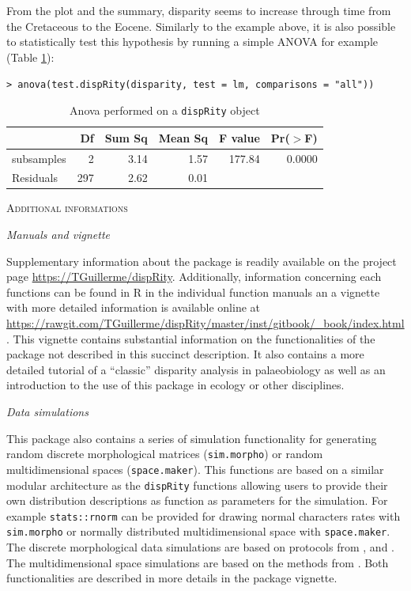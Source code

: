 \documentclass[12pt,letterpaper]{article}
\renewcommand{\section}[1]{%
\bigskip
\begin{center}
\begin{Large}
\normalfont\scshape #1
\medskip
\end{Large}
\end{center}}
\renewcommand{\subsection}[1]{%
\bigskip
\begin{center}
\begin{large}
\normalfont\itshape #1
\end{large}
\end{center}}
\newcommand{\disp}{\texttt{dispRity} }
\begin{document}
From the plot and the summary, disparity seems to increase through time from the Cretaceous to the Eocene. Similarly to the example above, it is also possible to statistically test this hypothesis by running a simple ANOVA for example (Table \ref{Tab:anova}): 

\texttt{> anova(test.dispRity(disparity, test = lm, comparisons = "all"))}

\begin{table}[ht]
\centering
\begin{tabular}{lrrrrr}
  \hline
 & Df & Sum Sq & Mean Sq & F value & Pr($>$F) \\ 
  \hline
subsamples & 2 & 3.14 & 1.57 & 177.84 & 0.0000 \\ 
  Residuals & 297 & 2.62 & 0.01 &  &  \\ 
   \hline
\end{tabular}
\caption{Anova performed on a \disp object}
\label{Tab:anova}
\end{table}


\section{Additional informations}
\subsection{Manuals and vignette}
Supplementary information about the package is readily available on the project page \url{https://TGuillerme/dispRity}.
Additionally, information concerning each functions can be found in R in the individual function manuals an a vignette with more detailed information is available online at \url{https://rawgit.com/TGuillerme/dispRity/master/inst/gitbook/_book/index.html}.
This vignette contains substantial information on the functionalities of the package not described in this succinct description.
It also contains a more detailed tutorial of a ``classic'' disparity analysis in palaeobiology as well as an introduction to the use of this package in ecology or other disciplines. 

\subsection{Data simulations}
This package also contains a series of simulation functionality for generating random discrete morphological matrices (\texttt{sim.morpho}) or random multidimensional spaces (\texttt{space.maker}).
This functions are based on a similar modular architecture as the \disp functions allowing users to provide their own distribution descriptions as function as parameters for the simulation.
For example \texttt{stats::rnorm} can be provided for drawing normal characters rates with \texttt{sim.morpho} or normally distributed multidimensional space with \texttt{space.maker}.
The discrete morphological data simulations are based on protocols from \cite{GuillermeCooper}, \cite{OReilly20160081} and \cite{puttick2017uncertain}. 
The multidimensional space simulations are based on the methods from \cite{diaz2016global}.
Both functionalities are described in more details in the package vignette.
\end{document}
